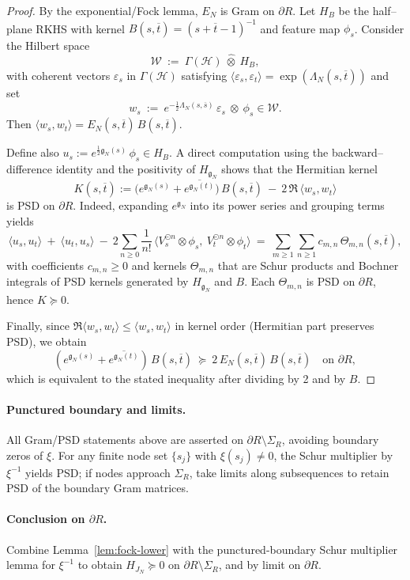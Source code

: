 \documentclass[11pt]{article}
\theoremstyle{remark}
\begin{document}
\begin{proof}
By the exponential/Fock lemma, $E_N$ is Gram on $\partial R$. Let $H_{\!B}$ be the half--plane RKHS with kernel $B(s,\overline t)=(s+\overline t-1)^{-1}$ and feature map $\phi_s$. Consider the Hilbert space
\[\mathcal W\ :=\ \Gamma(\mathcal H)\ \widehat\otimes\ H_{\!B},\]
with coherent vectors $\varepsilon_s$ in $\Gamma(\mathcal H)$ satisfying $\langle\varepsilon_s,\varepsilon_t\rangle=\exp(\Lambda_N(s,\overline t))$ and set
\[w_s\ :=\ e^{-\frac12\Lambda_N(s,\overline s)}\,\varepsilon_s\ \otimes\ \phi_s\in\mathcal W.
\]
Then $\langle w_s,w_t\rangle=E_N(s,\overline t)\,B(s,\overline t)$.

Define also $u_s:=e^{\frac12\mathfrak g_N(s)}\,\phi_s\in H_{\!B}$. A direct computation using the backward--difference identity and the positivity of $H_{\mathfrak g_N}$ shows that the Hermitian kernel
\[K(s,\overline t):=\bigl(e^{\mathfrak g_N(s)}+\overline{e^{\mathfrak g_N(t)}}\bigr)\,B(s,\overline t)\ -\ 2\,\Re\,\langle w_s, w_t\rangle\]
is PSD on $\partial R$. Indeed, expanding $e^{\mathfrak g_N}$ into its power series and grouping terms yields
\[\bigl\langle u_s, u_t\bigr\rangle\ +\ \bigl\langle u_t, u_s\bigr\rangle\ -\ 2\sum_{n\ge0}\frac{1}{n!}\,\bigl\langle V_s^{\odot n}\otimes \phi_s,\ V_t^{\odot n}\otimes \phi_t\bigr\rangle\ =\ \sum_{m\ge1}\sum_{n\ge1} c_{m,n}\,\Theta_{m,n}(s,\overline t),\]
with coefficients $c_{m,n}\ge0$ and kernels $\Theta_{m,n}$ that are Schur products and Bochner integrals of PSD kernels generated by $H_{\mathfrak g_N}$ and $B$. Each $\Theta_{m,n}$ is PSD on $\partial R$, hence $K\succeq0$.

Finally, since $\Re\langle w_s,w_t\rangle\le \langle w_s,w_t\rangle$ in kernel order (Hermitian part preserves PSD), we obtain
\[(e^{\mathfrak g_N(s)}+\overline{e^{\mathfrak g_N(t)}})\,B(s,\overline t)\ \succeq\ 2\,E_N(s,\overline t)\,B(s,\overline t)\quad\text{on }\partial R,
\]
which is equivalent to the stated inequality after dividing by 2 and by $B$.
\end{proof}

\paragraph{Punctured boundary and limits.} All Gram/PSD statements above are asserted on $\partial R\setminus\Sigma_R$, avoiding boundary zeros of $\xi$. For any finite node set $\{s_j\}$ with $\xi(s_j)\ne0$, the Schur multiplier by $\xi^{-1}$ yields PSD; if nodes approach $\Sigma_R$, take limits along subsequences to retain PSD of the boundary Gram matrices.

\paragraph{Conclusion on $\partial R$.} Combine Lemma~\ref{lem:fock-lower} with the punctured-boundary Schur multiplier lemma for $\xi^{-1}$ to obtain $H_{J_N}\succeq0$ on $\partial R\setminus\Sigma_R$, and by limit on $\partial R$.
\end{document}
